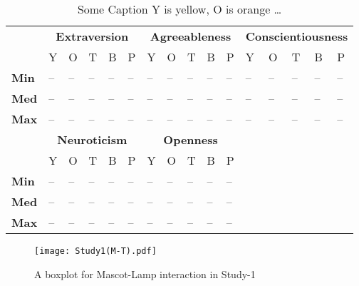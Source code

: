 \begin{table}[H]
    \renewcommand{\arraystretch}{1.2}
    \caption{Some Caption Y is yellow, O is orange \ldots}
    \label{table:medianMT1}
    \begin{center}
        \begin{tabular}{p{}|
        p{}|p{}|p{}|p{}|p{}||
        p{}|p{}|p{}|p{}|p{}||
        p{}|p{}|p{}|p{}|p{}|}
            \cline{2-16}
            & \multicolumn{5}{c||}{\textbf{Extraversion}} & \multicolumn{5}{c||}{\textbf{Agreeableness}}
            & \multicolumn{5}{c|}{\textbf{Conscientiousness}} \\
            \cline{2-16}
            & Y & O & T & B & P 			    & Y & O & T & B & P  	 	& Y & O & T & B & P     \\
            \cline{2-16}
            \textbf{Min}  	& -- & -- & -- & -- & -- 		& -- & -- & -- & -- & --  	& -- & -- & -- & -- & --  \\
            \textbf{Med} 	& -- & -- & -- & -- & -- 		& -- & -- & -- & -- & --  	& -- & -- & -- & -- & --  \\
            \textbf{Max}	& -- & -- & -- & -- & -- 		& -- & -- & -- & -- & --  	& -- & -- & -- & -- & -- \\
            \cline{2-16}
            \cline{2-11}
            &  \multicolumn{5}{|c||}{\textbf{Neuroticism}} & \multicolumn{5}{|c||}{\textbf{Openness}} \\
            \cline{2-11}
            & Y & O & T & B & P 			& Y & O & T & B & P    		\\
            \cline{2-11}
            \textbf{Min} 	& -- & -- & -- & -- & -- 		& -- & -- & -- & -- & -- 	\\
            \textbf{Med}    & -- & -- & -- & -- & -- 	    & -- & -- & -- & -- & -- 	\\
            \textbf{Max}  	& -- & -- & -- & -- & -- 		& -- & -- & -- & -- & --  	\\
            \cline{2-11}
        \end{tabular}
    \end{center}
\end{table}

\begin{figure}[H]
    \centering
    \texttt{[image: Study1(M-T).pdf]}
    \caption{A boxplot for Mascot-Lamp interaction in Study-1}
    \label{fig:MT1}
\end{figure}


